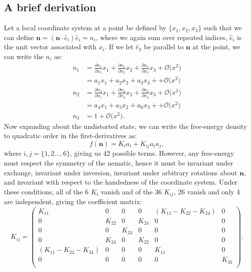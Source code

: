 \subsection{A brief derivation}
Let a local coordinate system at a point be defined by $\{x_1, x_2, x_3 \}$ such that we can define $\mathbf{n} = (\mathbf{n} \cdot \hat{e}_i) \hat{e}_i = n_i$, where we again sum over repeated indices, $\hat{e}_i$ is the unit vector associated with $x_i$.
If we let $\hat{e}_3$ be parallel to $\mathbf{n}$ at the point, we can write the $n_i$ as:
\label{e:2-LocalCoord}
\begin{align}
  n_1 &= \frac{\partial n_1}{\partial x_1}x_1 + \frac{\partial n_1}{\partial x_2}x_2 + \frac{\partial n_1}{\partial x_3}x_3 + \mathcal{O}\big (x^2 \big ) \nonumber \\
      &= a_1 x_1 + a_2 x_2 + a_3 x_3 + + \mathcal{O}\big (x^2 \big )\tag{\theequation a}\label{e:2-LocalCoordA}  \\
  n_2 &= \frac{\partial n_2}{\partial x_1}x_1 + \frac{\partial n_2}{\partial x_2}x_2 + \frac{\partial n_2}{\partial x_3}x_3 + \mathcal{O}\big (x^2 \big ) \nonumber  \\
      &= a_4 x_1 + a_5 x_2 + a_6 x_3 + + \mathcal{O}\big (x^2 \big )\tag{\theequation b}\label{e:2-LocalCoordB}  \\
  n_3 &= 1 + \mathcal{O}\big (x^2 \big ). \nonumber
\end{align}
Now expanding about the undistorted state, we can write the free-energy density to quadratic order in the first-derivatives as:
\begin{equation}
  f(\mathbf{n}) = K_i a_i + K_{ij} a_i a_j,\label{e:2-FrankGeneralExpansion}
\end{equation}
where $i,j = \{ 1,2 \dots, 6 \}$, giving us 42 possible terms.
However, any free-energy must respect the symmetry of the nematic, hence it must be invariant under exchange, invariant under inversion, invariant under arbitrary rotations about $\mathbf{n}$, and invariant with respect to the handedness of the coordinate system.
Under these conditions, all of the 6 $K_i$ vanish and of the 36 $K_{ij}$, 26 vanish and only 4 are independent, giving the coefficient matrix:
\begin{equation}
  K_{ij} =
  \begin{pmatrix}
    K_{11} & 0 & 0 & 0 & (K_{11}-K_{22}-K_{24}) & 0 \\
    0 & K_{22} & 0 & K_{24} & 0 & 0 \\
    0 & 0 & K_{33} & 0 & 0 & 0 \\
    0 & K_{24} & 0 & K_{22} & 0 & 0 \\
    (K_{11}-K_{22}-K_{24}) & 0 & 0 & 0 & K_{11} & 0 \\
    0 & 0 & 0 & 0 & 0 & K_{33} \\
  \end{pmatrix}.
\end{equation}
